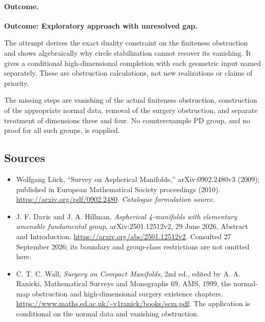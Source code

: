 \documentclass[11pt,a4paper]{article}
\numberwithin{equation}{section}
\begin{document}
\paragraph{Outcome.}
\textbf{Outcome: Exploratory approach with unresolved gap.}

The attempt derives the exact duality constraint on the finiteness
obstruction and shows algebraically why circle stabilization cannot
recover its vanishing. It gives a conditional high-dimensional
completion with each geometric input named separately. These are
obstruction calculations, not new realizations or claims of priority.

The missing steps are vanishing of the actual finiteness obstruction,
construction of the appropriate normal data, removal of the surgery
obstruction, and separate treatment of dimensions three and four.
No counterexample PD group, and no proof for all such groups, is supplied.
\subsection{Sources}
\begin{itemize}\raggedright
\item[\textnormal{[S1]}]\hypertarget{source:statement:1}{} Wolfgang Lück, “Survey on Aspherical Manifolds,” arXiv:0902.2480v3 (2009); published in European Mathematical Society proceedings (2010).
\url{https://arxiv.org/pdf/0902.2480}.
{\small\textit{Catalogue formulation source.}}
\item[\textnormal{[E1]}]\hypertarget{extra:statement:1}{}
J. F. Davis and J. A. Hillman, \emph{Aspherical 4-manifolds with elementary
amenable fundamental group}, arXiv:2501.12512v2, 29 June 2026, Abstract
and Introduction. \url{https://arxiv.org/abs/2501.12512v2}.
Consulted 27 September 2026; its boundary and group-class restrictions
are not omitted here.
\item[\textnormal{[E2]}]\hypertarget{extra:statement:2}{}
C. T. C. Wall, \emph{Surgery on Compact Manifolds}, 2nd ed., edited by
A. A. Ranicki, Mathematical Surveys and Monographs 69, AMS, 1999,
the normal-map obstruction and high-dimensional surgery existence
chapters. \url{https://www.maths.ed.ac.uk/~v1ranick/books/scm.pdf}.
The application is conditional on the normal data and vanishing obstruction.
\end{itemize}
\end{document}
